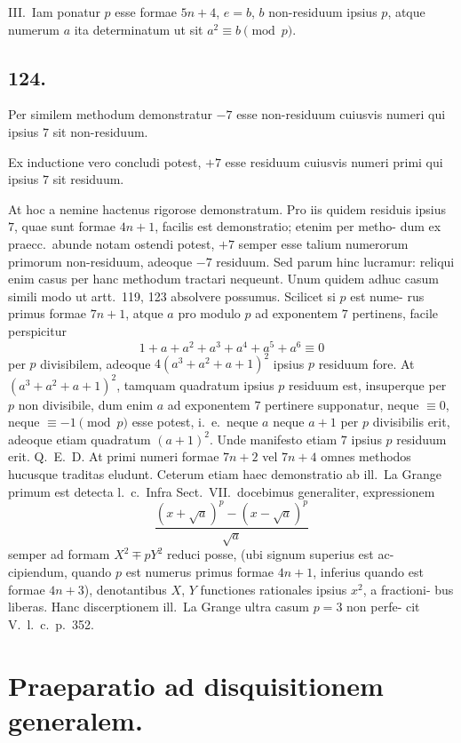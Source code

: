 \documentclass[12pt,a4paper]{article}
\theoremstyle{plain}
\theoremstyle{definition}
\theoremstyle{remark}
\begin{document}
III.\ Iam ponatur $p$ esse formae $5n+4$, $e = b$, $b$ non-residuum ipsius
$p$, atque numerum $a$ ita determinatum ut sit $a^2 \equiv b \pmod{p}$.


\subsection*{124.}

Per similem methodum demonstratur $-7$ esse non-residuum cuiusvis numeri qui ipsius $7$ sit non-residuum.

Ex inductione vero concludi potest, $+7$ esse residuum cuiusvis numeri
primi qui ipsius $7$ sit residuum.

At hoc a nemine hactenus rigorose demonstratum. Pro iis quidem residuis
ipsius $7$, quae sunt formae $4n+1$, facilis est demonstratio; etenim per metho-
dum ex praecc.\ abunde notam ostendi potest, $+7$ semper esse talium numerorum
primorum non-residuum, adeoque $-7$ residuum. Sed parum hinc lucramur:
reliqui enim casus per hanc methodum tractari nequeunt. Unum quidem adhuc
casum simili modo ut artt.~119, 123 absolvere possumus. Scilicet si $p$ est nume-
rus primus formae $7n+1$, atque $a$ pro modulo $p$ ad exponentem $7$ pertinens,
facile perspicitur
\[
1 + a + a^2 + a^3 + a^4 + a^5 + a^6 \equiv 0
\]
per $p$ divisibilem, adeoque $4(a^3+a^2+a+1)^2$ ipsius $p$ residuum fore. At $(a^3+a^2+a+1)^2$,
tamquam quadratum ipsius $p$ residuum est, insuperque per $p$ non divisibile,
dum enim $a$ ad exponentem $7$ pertinere supponatur, neque $\equiv 0$, neque
$\equiv -1 \pmod{p}$ esse potest, i.~e.\ neque $a$ neque $a+1$ per $p$ divisibilis erit,
adeoque etiam quadratum $(a+1)^2$. Unde manifesto etiam $7$ ipsius $p$ residuum
erit. Q.~E.~D. At primi numeri formae $7n+2$ vel $7n+4$ omnes methodos
hucusque traditas eludunt. Ceterum etiam haec demonstratio ab ill.\ La Grange
primum est detecta l.~c.\ Infra Sect.~VII.\ docebimus generaliter, expressionem
\[
\frac{(x+\sqrt{a})^p - (x-\sqrt{a})^p}{\sqrt{a}}
\]
semper ad formam $X^2 \mp pY^2$ reduci posse, (ubi signum superius est ac-
cipiendum, quando $p$ est numerus primus formae $4n+1$, inferius quando est
formae $4n+3$), denotantibus $X$, $Y$ functiones rationales ipsius $x^2$, a fractioni-
bus liberas. Hanc discerptionem ill.\ La Grange ultra casum $p = 3$ non perfe-
cit V.\ l.~c.\ p.~352.

\section*{Praeparatio ad disquisitionem generalem.}
\end{document}
